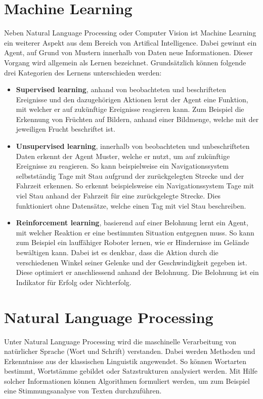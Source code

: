 \section{\gls{Machine Learning}}
Neben \gls{Natural Language Processing} oder \gls{Computer Vision} ist \gls{Machine Learning} ein weiterer Aspekt aus dem Bereich von \gls{Artifical Intelligence}. Dabei gewinnt ein Agent, auf Grund von Mustern innerhalb von Daten neue Informationen. Dieser Vorgang wird allgemein als Lernen bezeichnet. Grundsätzlich können folgende drei Kategorien des Lernens unterschieden werden:
\begin{itemize}
    \item \textbf{Supervised learning}, anhand von beobachteten und beschrifteten Ereignisse und den dazugehörigen Aktionen lernt der Agent eine Funktion, mit welcher er auf zukünftige Ereignisse reagieren kann. Zum Beispiel die Erkennung von Früchten auf Bildern, anhand einer Bildmenge, welche mit der jeweiligen Frucht beschriftet ist.\\
    \item \textbf{Unsupervised learning}, innerhalb von beobachteten und unbeschrifteten Daten erkennt der Agent Muster, welche er nutzt, um auf zukünftige Ereignisse zu reagieren. So kann beispielweise ein Navigationssystem selbstständig Tage mit Stau aufgrund der zurückgelegten Strecke und der Fahrzeit erkennen.
    So erkennt beispielsweise ein Navigationssystem Tage mit viel Stau anhand der Fahrzeit für eine zurückgelegte Strecke. Dies funktioniert ohne Datensätze, welche einen Tag mit viel Stau beschreiben.\\
    \item \textbf{Reinforcement learning}, basierend auf einer Belohnung lernt ein Agent, mit welcher Reaktion er eine bestimmten Situation entgegnen muss. So kann zum Beispiel ein lauffähiger Roboter lernen, wie er Hindernisse im Gelände bewältigen kann. Dabei ist es denkbar, dass die Aktion durch die verschiedenen Winkel seiner Gelenke und der Geschwindigkeit gegeben ist. Diese optimiert er anschliessend anhand der Belohnung. Die Belohnung ist ein Indikator für Erfolg oder Nichterfolg.\\
\end{itemize}
\cite{Russell:2009:AIM:1671238}

\section{\gls{Natural Language Processing}}\label{natural-language-processing}
Unter \gls{Natural Language Processing} wird die maschinelle Verarbeitung von natürlicher Sprache (Wort und Schrift) verstanden. Dabei werden Methoden und Erkenntnisse aus der klassischen \gls{Linguistik} angewendet. So können Wortarten bestimmt, Wortstämme gebildet oder Satzstrukturen analysiert werden. Mit Hilfe solcher Informationen können Algorithmen formuliert werden, um zum Beispiel eine Stimmungsanalyse von Texten durchzuführen. 


